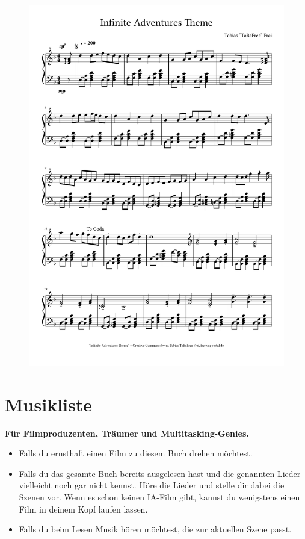 \begin{figure}[p]
    \includegraphics[width=\textwidth, page=2]{z-include-main-iatheme.pdf}
\end{figure}


\chapter{Musikliste}

\textbf{Für Filmproduzenten, Träumer und Multitasking-Genies.}

\begin{itemize}
    \item Falls du ernsthaft einen Film zu diesem Buch drehen möchtest.
    \item Falls du das gesamte Buch bereits ausgelesen hast und die genannten Lieder vielleicht noch gar nicht kennst. Höre die Lieder und stelle dir dabei die Szenen vor. Wenn es schon keinen IA-Film gibt, kannst du wenigstens einen Film in deinem Kopf laufen lassen.
    \item Falls du beim Lesen Musik hören möchtest, die zur aktuellen Szene passt.
\end{itemize}

